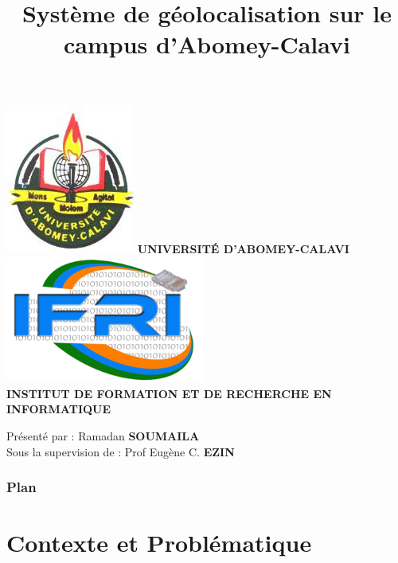 \documentclass[11pt,handout]{beamer}
\author[Ramadan SOUMAILA]{}
\title{Système de géolocalisation sur le campus d'Abomey-Calavi}
\institute{}
\date{}
\begin{document}
\begin{frame}
	\begin{center}
	\includegraphics[scale=0.15]{images/logoUAC1.png}
	 \hspace{1.1cm}
	  {\scriptsize \textbf{\textsf{UNIVERSITÉ D'ABOMEY-CALAVI}}}
	   \hspace{1.1cm}
	   \includegraphics[scale=0.15]{images/logoIfri.png}\\
	  {\footnotesize \textbf {\textsf{INSTITUT DE FORMATION ET DE RECHERCHE EN INFORMATIQUE}}}
	\end{center}
	\begin{center}
		\titlepage
		Présenté par : Ramadan \textbf{SOUMAILA\\}
		Sous la supervision de : Prof Eugène C. \textbf{EZIN}
	\end{center}
\end{frame}
\begin{frame}
\frametitle{Plan}
\tableofcontents
\end{frame}
	\section{Contexte et Problématique}
\end{document}
